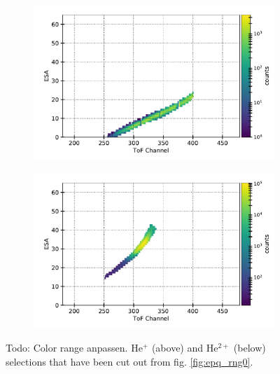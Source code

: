 \begin{figure}
	\centering
\begin{subfigure}{.9\linewidth}
	\centering
	\includegraphics[width=1\linewidth]{Figures/epq_He1.pdf}
	\centering
\end{subfigure}
\begin{subfigure}{.9\linewidth}
	\centering
	\includegraphics[width=1\linewidth]{Figures/epq_He2.pdf}
	\centering
\end{subfigure}
	\caption{Todo: Color range anpassen. $\mathrm{He^{+}}$ (above) and $\mathrm{He^{2+}}$ (below) selections that have been cut out from fig. \ref{fig:epq_rng0}.}
\label{fig:cutouts}
\end{figure}